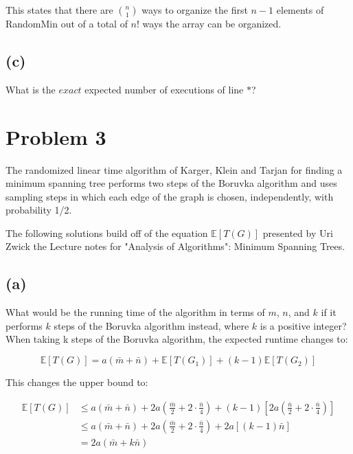 \documentclass[12pt]{article}
\begin{document}
This states that there are $\binom{n}{1}$ ways to organize the first $n
- 1$ elements of RandomMin out of a total of $n!$ ways the array can be
organized.

\subsection*{(c)}
What is the $exact$ expected number of executions of line \(*\)?


\section*{Problem 3}
The randomized linear time algorithm of Karger, Klein and Tarjan for
finding a minimum spanning tree performs two steps of the Boruvka
algorithm and uses sampling steps in which each edge of the graph is
chosen, independently, with probability 1/2.\newline

The following solutions build off of the equation $\mathbb{E}[T(G)]$
presented by Uri Zwick the Lecture notes for "Analysis of
Algorithms": Minimum Spanning Trees.


\subsection*{(a)}
What would be the running time of the algorithm in terms of $m$, $n$,
and $k$ if it performs $k$ steps of the Boruvka algorithm instead,
where $k$ is a positive integer?\\

When taking k steps of the Boruvka algorithm, the expected runtime changes
to:

\begin{equation*}
    \mathbb{E}[T(G)] = a(\bar{m} + \bar{n}) + \mathbb{E}[T(G_1)] +
    (k-1)\mathbb{E}[T(G_2)]
\end{equation*}

This changes the upper bound to:

\begin{align*}
    \mathbb{E}[T(G)] &\le a(\bar{m} + \bar{n}) 
        + 2a\left(\frac{\bar{m}}{2} + 2\cdot\frac{\bar{n}}{4}\right)
        + (k-1)\left[2a\left(\frac{\bar{n}}{2} + 2\cdot\frac{\bar{n}}{4}\right)\right] \\
                     &\le a(\bar{m} + \bar{n})
        + 2a\left(\frac{\bar{m}}{2} + 2\cdot\frac{\bar{n}}{4}\right)
        + 2a[(k-1)\bar{n}]\\
                     &= 2a(\bar{m} + k\bar{n})
\end{align*}
\end{document}
